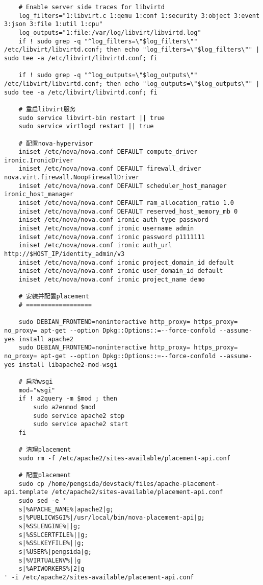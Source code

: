\documentclass[a4paper,left=1.5cm,right=1.5cm,11pt]{article}
\begin{document}
\begin{lstlisting}
	# Enable server side traces for libvirtd
	log_filters="1:libvirt.c 1:qemu 1:conf 1:security 3:object 3:event 3:json 3:file 1:util 1:cpu"
	log_outputs="1:file:/var/log/libvirt/libvirtd.log"
	if ! sudo grep -q "^log_filters=\"$log_filters\"" /etc/libvirt/libvirtd.conf; then echo "log_filters=\"$log_filters\"" | sudo tee -a /etc/libvirt/libvirtd.conf; fi

	if ! sudo grep -q "^log_outputs=\"$log_outputs\"" /etc/libvirt/libvirtd.conf; then echo "log_outputs=\"$log_outputs\"" | sudo tee -a /etc/libvirt/libvirtd.conf; fi

	# 重启libvirt服务
	sudo service libvirt-bin restart || true
	sudo service virtlogd restart || true

	# 配置nova-hypervisor
	iniset /etc/nova/nova.conf DEFAULT compute_driver ironic.IronicDriver
    iniset /etc/nova/nova.conf DEFAULT firewall_driver nova.virt.firewall.NoopFirewallDriver
    iniset /etc/nova/nova.conf DEFAULT scheduler_host_manager ironic_host_manager
    iniset /etc/nova/nova.conf DEFAULT ram_allocation_ratio 1.0
    iniset /etc/nova/nova.conf DEFAULT reserved_host_memory_mb 0
    iniset /etc/nova/nova.conf ironic auth_type password
    iniset /etc/nova/nova.conf ironic username admin
    iniset /etc/nova/nova.conf ironic password p1111111
    iniset /etc/nova/nova.conf ironic auth_url http://$HOST_IP/identity_admin/v3
    iniset /etc/nova/nova.conf ironic project_domain_id default
    iniset /etc/nova/nova.conf ironic user_domain_id default
    iniset /etc/nova/nova.conf ironic project_name demo

	# 安装并配置placement
	# ==================

	sudo DEBIAN_FRONTEND=noninteractive http_proxy= https_proxy= no_proxy= apt-get --option Dpkg::Options::=--force-confold --assume-yes install apache2
	sudo DEBIAN_FRONTEND=noninteractive http_proxy= https_proxy= no_proxy= apt-get --option Dpkg::Options::=--force-confold --assume-yes install libapache2-mod-wsgi

	# 启动wsgi
	mod="wsgi"
	if ! a2query -m $mod ; then
		sudo a2enmod $mod
		sudo service apache2 stop
		sudo service apache2 start
	fi

	# 清理placement
	sudo rm -f /etc/apache2/sites-available/placement-api.conf

	# 配置placement
	sudo cp /home/pengsida/devstack/files/apache-placement-api.template /etc/apache2/sites-available/placement-api.conf
	sudo sed -e '
	s|%APACHE_NAME%|apache2|g;
	s|%PUBLICWSGI%|/usr/local/bin/nova-placement-api|g;
	s|%SSLENGINE%||g;
	s|%SSLCERTFILE%||g;
	s|%SSLKEYFILE%||g;
	s|%USER%|pengsida|g;
	s|%VIRTUALENV%||g
	s|%APIWORKERS%|2|g
' -i /etc/apache2/sites-available/placement-api.conf


\end{lstlisting}
\end{document}
